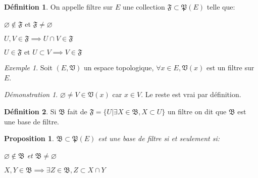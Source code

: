 \documentclass[a4paper, 11pt, french]{book}
\newenvironment{itemise}{\itemize}{\enditemize}
\theoremstyle{plain} %
\newtheorem{proposition}{Proposition}
\theoremstyle{definition} %
\newtheorem{definition}{Définition}
\theoremstyle{remark} %
\newtheorem{exemple}{Exemple}
\newtheorem*{demonstration}{Démonstration}
\newcommand{\1}{\mathds{1}}
\newcommand\vide{\varnothing}
\newcommand\et{\text{ et }}
\begin{document}
\begin{definition}
	On appelle filtre sur $E$ une collection $\mathfrak{F}\subset\mathfrak{P}(E)$ telle que:
	\begin{itemise}
		\item $\vide\notin\mathfrak{F}$ et $\mathfrak{F}\neq\vide$
		\item $U, V\in\mathfrak{F}\implies U\cap V\in\mathfrak{F}$
		\item $U\in\mathfrak{F}\et U\subset V\implies V\in\mathfrak{F}$
	\end{itemise}
\end{definition}

\begin{exemple}
	Soit $(E, \mathfrak{V})$ un espace topologique, $\forall x\in E, \mathfrak{V}(x)$ est un filtre sur $E$.
\end{exemple}

\begin{demonstration}
	$\vide\neq V\in\mathfrak{V}(x)$ car $x\in V$.
	Le reste est vrai par définition.
\end{demonstration}

\begin{definition}
	Si $\mathfrak{B}$ fait de $\mathfrak{F}=\{U|\exists X\in\mathfrak{B}, X\subset U\}$ un filtre on dit que $\mathfrak{B}$ est une base de filtre.
\end{definition}

\begin{proposition}
	$\mathfrak{B}\subset\mathfrak{P}(E)$ est une base de filtre si et seulement si:
	\begin{itemise}
		\item $\vide\notin\mathfrak{B}$ et $\mathfrak{B}\neq\vide$
		\item $X, Y\in\mathfrak{B}\implies\exists Z\in\mathfrak{B}, Z\subset X\cap Y$
	\end{itemise}
\end{proposition}
\end{document}
